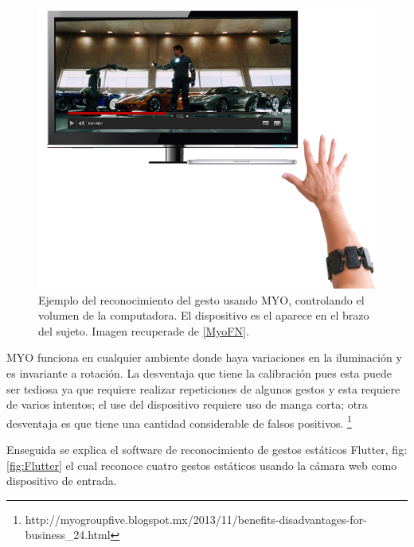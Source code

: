 \begin{figure}[h!]
\begin{center}
\includegraphics[scale=.5]{./Figures/MYO.png}
\end{center}
\caption{Ejemplo del reconocimiento del gesto usando MYO, controlando el volumen de la computadora. El dispositivo es el aparece en el brazo del sujeto. Imagen recuperade de \ref{MyoFN}.}
\label{fig:Myo}
\end{figure}

MYO funciona en cualquier ambiente donde haya variaciones en la iluminación y es invariante a rotación. La desventaja que tiene la calibración pues esta puede ser tediosa ya que requiere realizar repeticiones de algunos gestos y esta requiere de varios intentos; el use del dispositivo requiere uso de manga corta; otra desventaja es que tiene una cantidad considerable de falsos positivos. \footnote{http://myogroupfive.blogspot.mx/2013/11/benefits-disadvantages-for-business_24.html} 


Enseguida se explica el software de reconocimiento de gestos estáticos Flutter, fig:\ref{fig:Flutter} el cual reconoce cuatro gestos estáticos usando la cámara web como dispositivo de entrada. 

